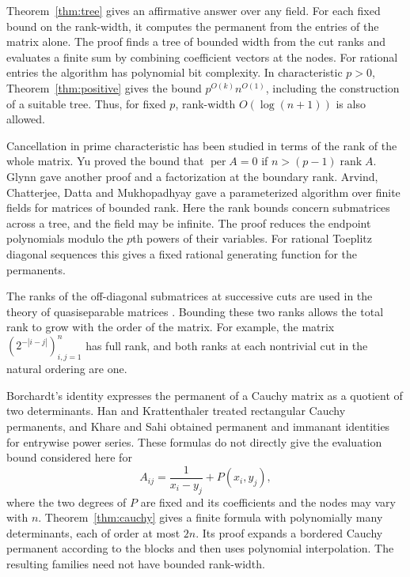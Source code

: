 \documentclass[11pt,reqno]{amsart}
\theoremstyle{remark}
\numberwithin{equation}{section}
\newcommand{\per}{\operatorname{per}}
\newcommand{\rk}{\operatorname{rank}}
\begin{document}
Theorem~\ref{thm:tree} gives an affirmative answer over any field.
For each fixed bound on the rank-width, it computes the permanent
from the entries of the matrix alone. The proof finds a tree of
bounded width from the cut ranks and evaluates a finite sum by
combining coefficient vectors at the nodes. For rational entries
the algorithm has polynomial bit complexity. In characteristic
\(p>0\), Theorem~\ref{thm:positive} gives the bound
\(p^{O(k)}n^{O(1)}\), including the construction of a suitable tree.
Thus, for fixed \(p\), rank-width \(O(\log(n+1))\) is also allowed.

Cancellation in prime characteristic has been studied in terms of
the rank of the whole matrix. Yu \cite{Yu} proved the bound that
\(\per A=0\) if \(n>(p-1)\rk A\). Glynn \cite{Glynn} gave another
proof and a factorization at the boundary rank. Arvind, Chatterjee,
Datta and Mukhopadhyay \cite[Corollary 4.7]{ACDM} gave a parameterized
algorithm over finite fields for matrices of bounded rank.
Here the rank bounds concern submatrices across a tree, and the
field may be infinite. The proof reduces the endpoint polynomials
modulo the \(p\)th powers of their variables. For rational Toeplitz
diagonal sequences this gives a fixed rational generating function
for the permanents.

The ranks of the off-diagonal submatrices at successive cuts are
used in the theory of quasiseparable matrices
\cite{PernetStorjohann,PernetSignargoutVillard}. Bounding these two
ranks allows the total rank to grow with the order of the matrix. For
example, the matrix \((2^{-|i-j|})_{i,j=1}^n\) has full rank, and both
ranks at each nontrivial cut in the natural ordering are one.

Borchardt's identity \cite{Borchardt} expresses the permanent of a
Cauchy matrix as a quotient of two determinants. Han and
Krattenthaler \cite{HK} treated rectangular Cauchy permanents, and
Khare and Sahi \cite{KS} obtained permanent and immanant identities
for entrywise power series. These formulas do not directly give the
evaluation bound considered here for
\[
 A_{ij}=\frac1{x_i-y_j}+P(x_i,y_j),
\]
where the two degrees of \(P\) are fixed and its coefficients and
the nodes may vary with \(n\). Theorem~\ref{thm:cauchy} gives a finite
formula with polynomially many determinants, each of order at most
\(2n\). Its proof expands a bordered Cauchy permanent according to
the blocks and then uses polynomial interpolation. The resulting
families need not have bounded rank-width.
\end{document}
